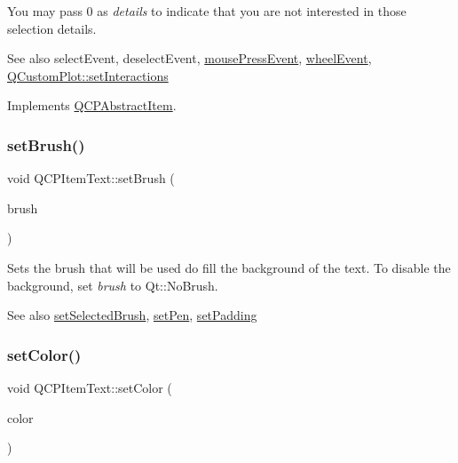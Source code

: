 You may pass 0 as {\itshape details} to indicate that you are not interested in those selection details.

\begin{DoxySeeAlso}{See also}
select\+Event, deselect\+Event, \hyperlink{class_q_c_p_layerable_af6567604818db90f4fd52822f8bc8376}{mouse\+Press\+Event}, \hyperlink{class_q_c_p_layerable_a47dfd7b8fd99c08ca54e09c362b6f022}{wheel\+Event}, \hyperlink{class_q_custom_plot_a5ee1e2f6ae27419deca53e75907c27e5}{Q\+Custom\+Plot\+::set\+Interactions} 
\end{DoxySeeAlso}


Implements \hyperlink{class_q_c_p_abstract_item_ae41d0349d68bb802c49104afd100ba2a}{Q\+C\+P\+Abstract\+Item}.

\mbox{\label{class_q_c_p_item_text_a1c7e131516df2ed8d941ef31240ded8e}} 
\subsubsection{\texorpdfstring{set\+Brush()}{setBrush()}}
{\footnotesize\ttfamily void Q\+C\+P\+Item\+Text\+::set\+Brush (\begin{DoxyParamCaption}\item[{const Q\+Brush \&}]{brush }\end{DoxyParamCaption})}

Sets the brush that will be used do fill the background of the text. To disable the background, set {\itshape brush} to Qt\+::\+No\+Brush.

\begin{DoxySeeAlso}{See also}
\hyperlink{class_q_c_p_item_text_a6b8377eeb2af75eb9528422671ac16cb}{set\+Selected\+Brush}, \hyperlink{class_q_c_p_item_text_a9b9ec6eea0eb0603977ff84d4c78d0a3}{set\+Pen}, \hyperlink{class_q_c_p_item_text_aeea8a3e01f135f9dd0bb08f51db66310}{set\+Padding} 
\end{DoxySeeAlso}
\mbox{\label{class_q_c_p_item_text_aa51efc0841fe52da9eaf8aff6fc8a8b2}} 
\subsubsection{\texorpdfstring{set\+Color()}{setColor()}}
{\footnotesize\ttfamily void Q\+C\+P\+Item\+Text\+::set\+Color (\begin{DoxyParamCaption}\item[{const Q\+Color \&}]{color }\end{DoxyParamCaption})}

